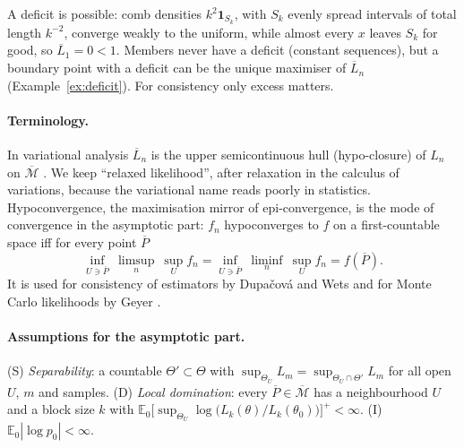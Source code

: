 \documentclass[11pt]{article}
\newcommand{\E}{\mathbb E}
\newcommand{\bM}{\overline{\mathcal M}}
\newcommand{\bP}{\overline P}
\newcommand{\bL}{\overline L}
\theoremstyle{definition}
\theoremstyle{remark}
\begin{document}
A deficit is possible: comb densities $k^2\mathbf 1_{S_k}$, with $S_k$ evenly
spread intervals of total length $k^{-2}$, converge weakly to the uniform,
while almost every $x$ leaves $S_k$ for good, so $\bL_1=0<1$. Members never
have a deficit (constant sequences), but a boundary point with a deficit
can be the unique maximiser of $\bL_n$ (Example~\ref{ex:deficit}). For
consistency only excess matters.

\paragraph{Terminology.} In variational analysis $\bL_n$ is the upper
semicontinuous hull (hypo-closure) of $L_n$ on $\bM$ \cite{rw}. We keep
``relaxed likelihood'', after relaxation in the calculus of variations,
because the variational name reads poorly in statistics. Hypoconvergence,
the maximisation mirror of epi-convergence, is the mode of convergence in
the asymptotic part: $f_n$ hypoconverges to $f$ on a first-countable space
iff for every point $\bP$
\[
 \inf_{U\ni\bP}\ \limsup_n\ \sup_U f_n
 =\inf_{U\ni\bP}\ \liminf_n\ \sup_U f_n=f(\bP).
\]
It is used for consistency of estimators by Dupa\v cov\'a and Wets
\cite{dw} and for Monte Carlo likelihoods by Geyer \cite{geyer94}.

\paragraph{Assumptions for the asymptotic part.}
(S) \emph{Separability}: a countable $\Theta'\subset\Theta$ with
$\sup_{\Theta_U}L_m=\sup_{\Theta_U\cap\Theta'}L_m$ for all open $U$, $m$ and
samples. (D) \emph{Local domination}: every $\bP\in\bM$ has a neighbourhood
$U$ and a block size $k$ with
$\E_0\bigl[\sup_{\Theta_U}\log\bigl(L_k(\theta)/L_k(\theta_0)\bigr)\bigr]^+<\infty$.
(I) $\E_0|\log p_0|<\infty$.
\end{document}
